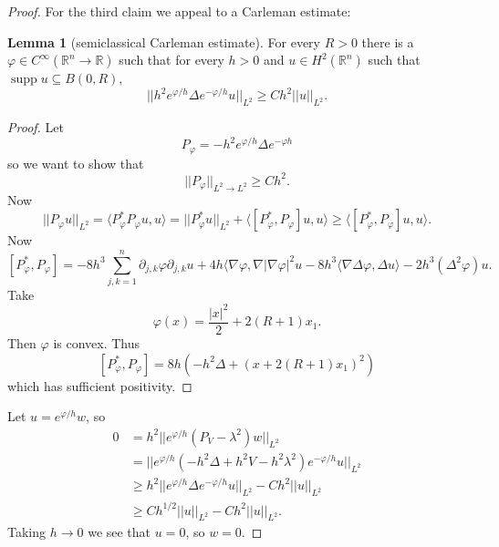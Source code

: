 \documentclass[12pt]{report}
\newcommand{\RR}{\mathbb{R}}
\newcommand{\supp}{\operatorname{supp}}
\theoremstyle{definition}
\newtheorem{lemma}[theorem]{Lemma}
\begin{document}
\begin{proof}
For the third claim we appeal to a Carleman estimate:
\begin{lemma}[semiclassical Carleman estimate]
For every $R > 0$ there is a $\varphi \in C^\infty(\RR^n \to \RR)$ such that for every $h > 0$ and $u \in H^2(\RR^n)$ such that $\supp u \subseteq B(0, R)$,
$$||h^2e^{\varphi/h}\Delta e^{-\varphi/h}u||_{L^2} \geq Ch^2||u||_{L^2}.$$
\end{lemma}
\begin{proof}
Let
$$P_\varphi = -h^2e^{\varphi/h}\Delta e^{-\varphi h}$$
so we want to show that
$$||P_\varphi||_{L^2 \to L^2} \geq Ch^2.$$
Now
$$||P_\varphi u||_{L^2} = \langle P_\varphi^*P_\varphi u, u\rangle = ||P_\varphi^*u||_{L^2} + \langle [P_\varphi^*, P_\varphi]u, u\rangle
\geq \langle [P_\varphi^*, P_\varphi]u, u\rangle.$$
Now
$$[P_\varphi^*, P_\varphi] = -8h^3\sum_{j,k=1}^n \partial_{j,k}\varphi \partial_{j,k}u + 4h\langle \nabla \varphi, \nabla|\nabla \varphi|^2u - 8h^3\langle \nabla \Delta\varphi, \Delta u\rangle - 2h^3(\Delta^2\varphi)u.$$
Take
$$\varphi(x) = \frac{|x|^2}{2} + 2(R+1)x_1.$$
Then $\varphi$ is convex. Thus
$$[P_\varphi^*, P_\varphi] = 8h(-h^2\Delta + (x + 2(R+1)x_1)^2)$$
which has sufficient positivity.
\end{proof}

Let $u = e^{\varphi/h}w$, so
\begin{align*}0 &= h^2||e^{\varphi/h}(P_V - \lambda^2)w||_{L^2} \\
&= ||e^{\varphi/h}(-h^2\Delta + h^2V- h^2\lambda^2)e^{-\varphi/h}u||_{L^2}\\
& \geq h^2 ||e^{\varphi/h}\Delta e^{-\varphi/h}u||_{L^2} - Ch^2||u||_{L^2}\\
&\geq Ch^{1/2}||u||_{L^2}-Ch^2||u||_{L^2}.
\end{align*}
Taking $h \to 0$ we see that $u = 0$, so $w = 0$.
\end{proof}
\end{document}
